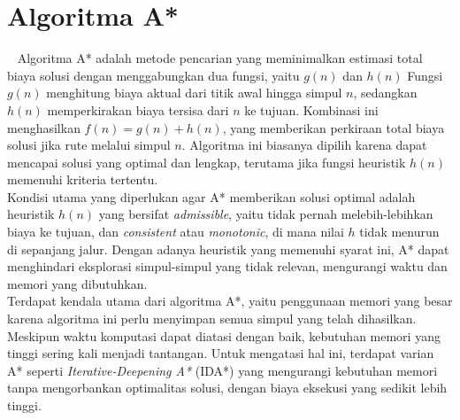 \section{Algoritma A*}
\label{a*}
~\cite{Russell:09:ai}
Algoritma A* adalah metode pencarian yang meminimalkan estimasi total biaya solusi dengan menggabungkan dua fungsi, yaitu  
$g(n)$ dan $h(n)$ Fungsi $g(n)$ menghitung biaya aktual dari titik awal hingga simpul $n$, sedangkan $h(n)$ memperkirakan biaya tersisa dari $n$ ke tujuan. Kombinasi ini menghasilkan $f(n) = g(n) + h(n)$, yang memberikan perkiraan total biaya solusi jika rute melalui simpul $n$. Algoritma ini biasanya dipilih karena dapat mencapai solusi yang optimal dan lengkap, terutama jika fungsi heuristik $h(n)$ memenuhi kriteria tertentu.
\\
Kondisi utama yang diperlukan agar A* memberikan solusi optimal adalah heuristik $h(n)$ yang bersifat \textit{admissible}, yaitu tidak pernah melebih-lebihkan biaya ke tujuan, dan \textit{consistent} atau \textit{monotonic}, di mana nilai $h$ tidak menurun di sepanjang jalur. Dengan adanya heuristik yang memenuhi syarat ini, A* dapat menghindari eksplorasi simpul-simpul yang tidak relevan, mengurangi waktu dan memori yang dibutuhkan.
\\
Terdapat kendala utama dari algoritma A*, yaitu penggunaan memori yang besar karena algoritma ini perlu menyimpan semua simpul yang telah dihasilkan. Meskipun waktu komputasi dapat diatasi dengan baik, kebutuhan memori yang tinggi sering kali menjadi tantangan. Untuk mengatasi hal ini, terdapat varian A* seperti \textit{Iterative-Deepening A*} (IDA*) yang mengurangi kebutuhan memori tanpa mengorbankan optimalitas solusi, dengan biaya eksekusi yang sedikit lebih tinggi.